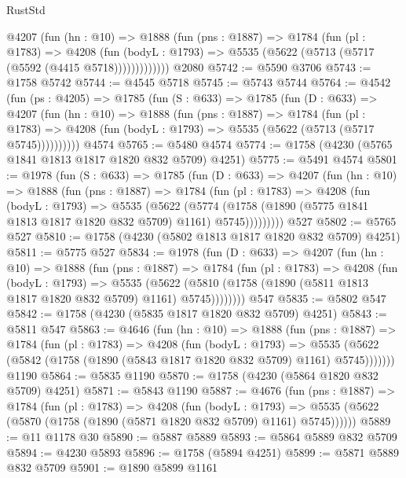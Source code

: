 \begin{lexlean}{RustStd}
\begin{coremodule}
{\begin{coremodule}
{{{{{{{{{{{{{{{          @4207
            (fun (hn : @10) =>
            @1888
              (fun (pns : @1887) =>
              @1784
                (fun (pl : @1783) =>
                @4208
                  (fun (bodyL : @1793) =>
                  @5535 (@5622 (@5713 (@5717 (@5592 (@4415 @5718)))))))))))))
    @2080
@5742 := @5590 @3706
@5743 := @1758 @5742
@5744 := @4545 @5718
@5745 := @5743 @5744
@5764 := @4542
    (fun (ps : @4205) =>
    @1785
      (fun (S : @633) =>
      @1785
        (fun (D : @633) =>
        @4207
          (fun (hn : @10) =>
          @1888
            (fun (pns : @1887) =>
            @1784
              (fun (pl : @1783) =>
              @4208 (fun (bodyL : @1793) => @5535 (@5622 (@5713 (@5717 @5745))))))))))
    @4574
@5765 := @5480 @4574
@5774 := @1758 (@4230 (@5765 @1841 @1813 @1817 @1820 @832 @5709) @4251)
@5775 := @5491 @4574
@5801 := @1978
    (fun (S : @633) =>
    @1785
      (fun (D : @633) =>
      @4207
        (fun (hn : @10) =>
        @1888
          (fun (pns : @1887) =>
          @1784
            (fun (pl : @1783) =>
            @4208
              (fun (bodyL : @1793) =>
              @5535
                (@5622
                  (@5774
                    (@1758 (@1890 (@5775 @1841 @1813 @1817 @1820 @832 @5709) @1161) @5745)))))))))
    @527
@5802 := @5765 @527
@5810 := @1758 (@4230 (@5802 @1813 @1817 @1820 @832 @5709) @4251)
@5811 := @5775 @527
@5834 := @1978
    (fun (D : @633) =>
    @4207
      (fun (hn : @10) =>
      @1888
        (fun (pns : @1887) =>
        @1784
          (fun (pl : @1783) =>
          @4208
            (fun (bodyL : @1793) =>
            @5535
              (@5622 (@5810 (@1758 (@1890 (@5811 @1813 @1817 @1820 @832 @5709) @1161) @5745))))))))
    @547
@5835 := @5802 @547
@5842 := @1758 (@4230 (@5835 @1817 @1820 @832 @5709) @4251)
@5843 := @5811 @547
@5863 := @4646
    (fun (hn : @10) =>
    @1888
      (fun (pns : @1887) =>
      @1784
        (fun (pl : @1783) =>
        @4208
          (fun (bodyL : @1793) =>
          @5535 (@5622 (@5842 (@1758 (@1890 (@5843 @1817 @1820 @832 @5709) @1161) @5745)))))))
    @1190
@5864 := @5835 @1190
@5870 := @1758 (@4230 (@5864 @1820 @832 @5709) @4251)
@5871 := @5843 @1190
@5887 := @4676
    (fun (pns : @1887) =>
    @1784
      (fun (pl : @1783) =>
      @4208
        (fun (bodyL : @1793) =>
        @5535 (@5622 (@5870 (@1758 (@1890 (@5871 @1820 @832 @5709) @1161) @5745))))))
@5889 := @11 @1178 @30
@5890 := @5887 @5889
@5893 := @5864 @5889 @832 @5709
@5894 := @4230 @5893
@5896 := @1758 (@5894 @4251)
@5899 := @5871 @5889 @832 @5709
@5901 := @1890 @5899 @1161
}}}}}}}}}}}}}}}
\end{coremodule}}
\end{coremodule}
\end{lexlean}
